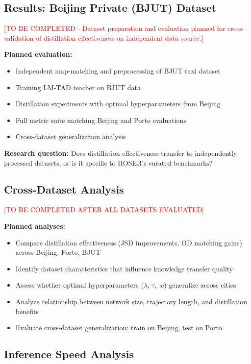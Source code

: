 \subsection{Results: Beijing Private (BJUT) Dataset}
\label{sec:eval-bjut}

\textcolor{red}{[TO BE COMPLETED - Dataset preparation and evaluation planned for cross-validation of distillation effectiveness on independent data source.]}

\textbf{Planned evaluation:}
\begin{itemize}[noitemsep,topsep=0pt]
\item Independent map-matching and preprocessing of BJUT taxi dataset
\item Training LM-TAD teacher on BJUT data
\item Distillation experiments with optimal hyperparameters from Beijing
\item Full metric suite matching Beijing and Porto evaluations
\item Cross-dataset generalization analysis
\end{itemize}

\textbf{Research question:} Does distillation effectiveness transfer to independently processed datasets, or is it specific to HOSER's curated benchmarks?

\subsection{Cross-Dataset Analysis}
\label{sec:eval-cross}

\textcolor{red}{[TO BE COMPLETED AFTER ALL DATASETS EVALUATED]}

\textbf{Planned analyses:}
\begin{itemize}[noitemsep,topsep=0pt]
\item Compare distillation effectiveness (JSD improvements, OD matching gains) across Beijing, Porto, BJUT
\item Identify dataset characteristics that influence knowledge transfer quality
\item Assess whether optimal hyperparameters ($\lambda$, $\tau$, $w$) generalize across cities
\item Analyze relationship between network size, trajectory length, and distillation benefits
\item Evaluate cross-dataset generalization: train on Beijing, test on Porto
\end{itemize}

\subsection{Inference Speed Analysis}
\label{sec:eval-inference}

